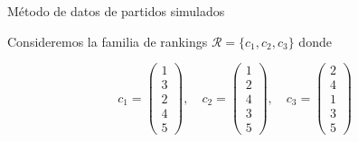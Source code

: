 \documentclass[10pt]{beamer}
\begin{document}
	\begin{frame}{Método de datos de partidos simulados}
		\begin{ejemplo}
			Consideremos la familia de rankings $\mathcal{R} = \{c_1, c_2, c_3\}$ donde
			
			\begin{equation*}
			c_1 = \left( \begin{array}{c}
			1\\
			3\\
			2\\
			4\\
			5
			\end{array} \right), \quad
			c_2 = \left( \begin{array}{c}
			1\\
			2\\
			4\\
			3\\
			5
			\end{array} \right), \quad
			c_3 = \left( \begin{array}{c}
			2\\
			4\\
			1\\
			3\\
			5
			\end{array} \right)
			\end{equation*}
			
		\end{ejemplo}
	\end{frame}
	
\end{document}
